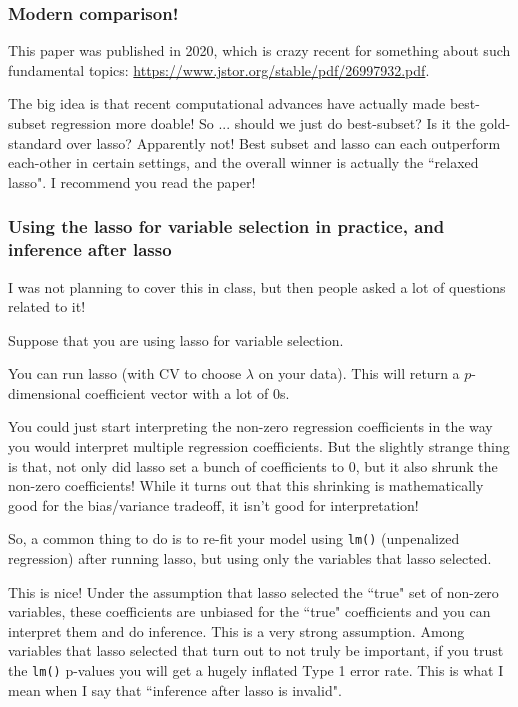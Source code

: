 \subsubsection{Modern comparison!}

This paper was published in 2020, which is crazy recent for something about such fundamental topics:
\url{https://www.jstor.org/stable/pdf/26997932.pdf}. 

The big idea is that recent computational advances have actually made best-subset regression more doable! So ... should we just do best-subset? Is it the gold-standard over lasso? Apparently not! Best subset and lasso can each outperform each-other in certain settings, and the overall winner is actually the ``relaxed lasso". I recommend you read the paper!

\subsubsection{Using the lasso for variable selection in practice, and inference after lasso}

I was not planning to cover this in class, but then people asked a lot of questions related to it!

Suppose that you are using lasso for variable selection. 

You can run lasso (with CV to choose $\lambda$ on your data). This will return a $p$-dimensional coefficient vector with a lot of $0$s. 

You could just start interpreting the non-zero regression coefficients in the way you would interpret multiple regression coefficients. But the slightly strange thing is that, not only did lasso set a bunch of coefficients to $0$, but it also shrunk the non-zero coefficients! While it turns out that this shrinking is mathematically good for the bias/variance tradeoff, it isn't good for interpretation! 

So, a common thing to do is to re-fit your model using \texttt{lm()} (unpenalized regression) after running lasso, but using only the variables that lasso selected.

This is nice! Under the assumption that lasso selected the ``true" set of non-zero variables, these coefficients are unbiased for the ``true" coefficients and you can interpret them and do inference. This is a very strong assumption. Among variables that lasso selected that turn out to not truly be important, if you trust the \texttt{lm()} p-values you will get a hugely inflated Type 1 error rate. This is what I mean when I say that ``inference after lasso is invalid".

